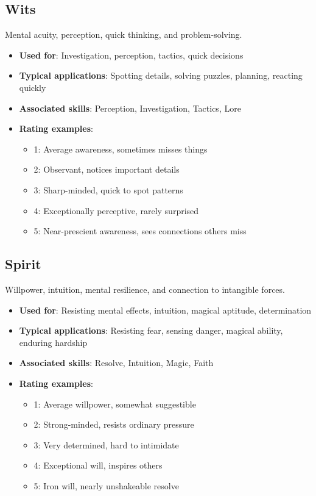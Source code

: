 \subsection*{Wits}

Mental acuity, perception, quick thinking, and problem-solving.
\begin{itemize}
\item \textbf{Used for}: Investigation, perception, tactics, quick decisions
\item \textbf{Typical applications}: Spotting details, solving puzzles, planning, reacting quickly
\item \textbf{Associated skills}: Perception, Investigation, Tactics, Lore
\item \textbf{Rating examples}:
  \begin{itemize}
    \item 1: Average awareness, sometimes misses things
    \item 2: Observant, notices important details
    \item 3: Sharp-minded, quick to spot patterns
    \item 4: Exceptionally perceptive, rarely surprised
    \item 5: Near-prescient awareness, sees connections others miss
  \end{itemize}
\end{itemize}

\subsection*{Spirit}

Willpower, intuition, mental resilience, and connection to intangible forces.
\begin{itemize}
\item \textbf{Used for}: Resisting mental effects, intuition, magical aptitude, determination
\item \textbf{Typical applications}: Resisting fear, sensing danger, magical ability, enduring hardship
\item \textbf{Associated skills}: Resolve, Intuition, Magic, Faith
\item \textbf{Rating examples}:
  \begin{itemize}
    \item 1: Average willpower, somewhat suggestible
    \item 2: Strong-minded, resists ordinary pressure
    \item 3: Very determined, hard to intimidate
    \item 4: Exceptional will, inspires others
    \item 5: Iron will, nearly unshakeable resolve
  \end{itemize}
\end{itemize}


